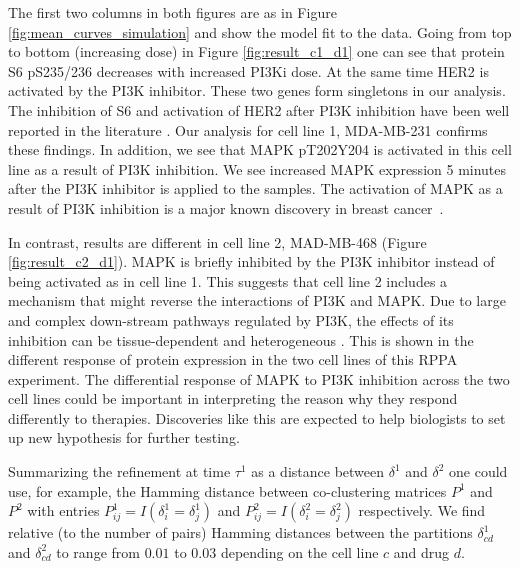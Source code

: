 The first two columns in both figures are as in Figure
\ref{fig:mean_curves_simulation} and show the model fit to the data.
Going from top to bottom (increasing dose) in Figure
\ref{fig:result_c1_d1} one can see that protein
S6 pS235/236
decreases with increased  PI3Ki dose.
At the same time HER2 is activated by the PI3K inhibitor. These two genes
form singletons in our analysis. The inhibition of S6 and activation
of HER2 after PI3K inhibition have been well
reported in the literature
\citep{podsypanina2001inhibitor,serra2011pi3k}. Our analysis for cell
line 1, MDA-MB-231 confirms these findings. In addition, we see
that MAPK pT202Y204 is activated in this cell line as a result of PI3K
inhibition.
We see increased MAPK expression 5 minutes after the PI3K inhibitor is
applied to the samples.
The activation of MAPK as a result of PI3K inhibition is
a major known discovery  in breast cancer~\citep{liu2009targeting}. 

In
contrast, results are different in cell line 2, MAD-MB-468  (Figure
\ref{fig:result_c2_d1}). MAPK is briefly inhibited by
the PI3K inhibitor instead of being activated as in cell line
1. This suggests that cell line 2 includes a mechanism that might reverse the
interactions of PI3K and MAPK. Due to large and complex
down-stream pathways regulated by PI3K, the effects of its inhibition
can be tissue-dependent 
and heterogeneous \citep{engelman2009targeting}. This is shown in the
different response of protein expression in the two cell lines of this
RPPA experiment. The differential response of MAPK to PI3K inhibition
across the two cell lines could be important in interpreting the
reason why they respond differently to therapies.
Discoveries like this are expected to help biologists to set up new hypothesis for further testing.

Summarizing the refinement at time $\tau^1$ as a distance between
$\delta^1$ and $\delta^2$ one could use, for example, the Hamming
distance between co-clustering matrices $P^1$ and $P^2$ with entries
$P^1_{ij}=I(\delta^1_i=\delta^1_j)$ and
$P^2_{ij}=I(\delta^2_i=\delta^2_j)$ respectively.  We find relative
(to the number of pairs) Hamming distances between the partitions
$\delta^1_{cd}$ and $\delta^2_{cd}$ to range from $0.01$ to $0.03$
depending on the cell line $c$ and drug $d$.

